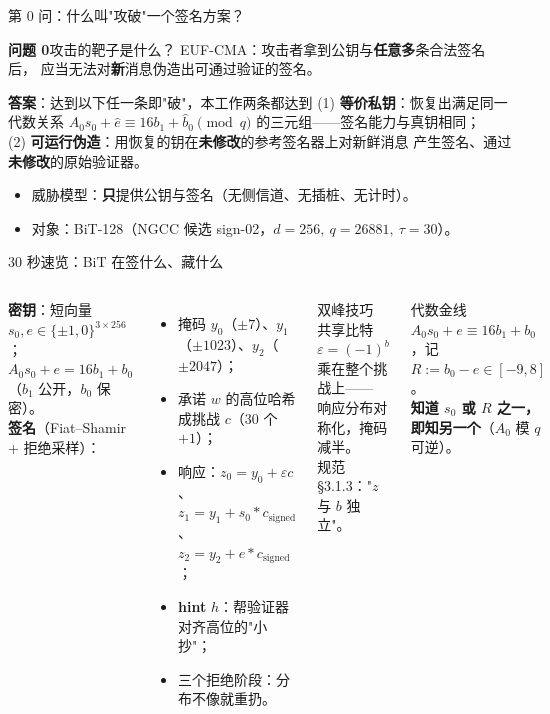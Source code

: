 \documentclass[11pt,aspectratio=169]{ctexbeamer}
\begin{document}
\begin{frame}{第 0 问：什么叫"攻破"一个签名方案？}
  \begin{block}{\textbf{问题 0}\quad 攻击的靶子是什么？}
    \small EUF-CMA：攻击者拿到公钥与\textbf{任意多}条合法签名后，
    应当无法对\textbf{新}消息伪造出可通过验证的签名。
  \end{block}
  \begin{exampleblock}{\textbf{答案}：达到以下任一条即"破"，本工作两条都达到}
    \small
    (1) \textbf{等价私钥}：恢复出满足同一代数关系
    $A_0 s_0 + \hat e \equiv 16 b_1 + \hat b_0 \pmod q$ 的三元组——签名能力与真钥相同；\\
    (2) \textbf{可运行伪造}：用恢复的钥在\textbf{未修改}的参考签名器上对新鲜消息
    产生签名、通过\textbf{未修改}的原始验证器。
  \end{exampleblock}
  \begin{itemize}
    \item 威胁模型：\textbf{只}提供公钥与签名（无侧信道、无插桩、无计时）。
    \item 对象：BiT-128（NGCC 候选 sign-02，$d=256,\ q=26881,\ \tau=30$）。
  \end{itemize}
\end{frame}

\begin{frame}{30 秒速览：BiT 在签什么、藏什么}
  \begin{columns}[T]
    \small
    \textbf{密钥}：短向量 $s_0, e\in\{\pm1,0\}^{3\times256}$；
    $A_0 s_0 + e = 16b_1 + b_0$（$b_1$ 公开，$b_0$ 保密）。\\[0.4em]
    \textbf{签名}（Fiat--Shamir + 拒绝采样）：
    \begin{itemize}
      \item 掩码 $y_0$（$\pm7$）、$y_1$（$\pm1023$）、$y_2$（$\pm2047$）；
      \item 承诺 $w$ 的高位哈希成挑战 $c$（30 个 $+1$）；
      \item 响应：$z_0 = y_0 + \varepsilon c$、
            $z_1 = y_1 + s_0*c_{\mathrm{signed}}$、
            $z_2 = y_2 + e*c_{\mathrm{signed}}$；
      \item \textbf{hint} $h$：帮验证器对齐高位的"小抄"；
      \item 三个拒绝阶段：分布不像就重扔。
    \end{itemize}
    \begin{block}{双峰技巧}
      \small 共享比特 $\varepsilon = (-1)^b$ 乘在整个挑战上——
      响应分布对称化，掩码减半。\\[0.3em]
      规范 §3.1.3："$z$ 与 $b$ 独立"。
    \end{block}
    \begin{alertblock}{代数金线}
      \small $A_0 s_0 + e \equiv 16b_1 + b_0$，记
      $R := b_0 - e \in [-9,8]$。\\
      \textbf{知道 $s_0$ 或 $R$ 之一，即知另一个}（$A_0$ 模 $q$ 可逆）。
    \end{alertblock}
  \end{columns}
\end{frame}
\end{document}
